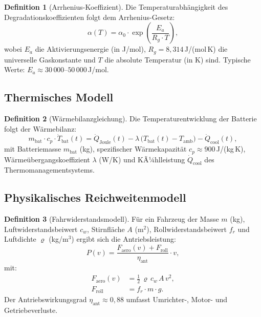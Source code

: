 ﻿\documentclass[a4paper,12pt]{article}
\theoremstyle{definition}
\newtheorem{definition}{Definition}
\begin{document}
\begin{definition}[Arrhenius-Koeffizient]
  Die Temperaturabh\"angigkeit des Degradationskoeffizienten folgt dem
  Arrhenius-Gesetz:
  \[
    \alpha(T) = \alpha_0 \cdot \exp\!\left(\frac{E_a}{R_g \cdot T}\right),
  \]
  wobei $E_a$ die Aktivierungsenergie (in J/mol), $R_g = 8{,}314$\,J/(mol\,K)
  die universelle Gaskonstante und $T$ die absolute Temperatur (in K) sind.
  Typische Werte: $E_a \approx 30\,000$--$50\,000$\,J/mol.
\end{definition}

\subsection{Thermisches Modell}

\begin{definition}[W\"armebilanzgleichung]
  Die Temperaturentwicklung der Batterie folgt der W\"armebilanz:
  \[
    m_{\mathrm{bat}} \cdot c_p \cdot \dot{T}_{\mathrm{bat}}(t)
    = \dot{Q}_{\mathrm{Joule}}(t)
      - \lambda\,\bigl(T_{\mathrm{bat}}(t) - T_{\mathrm{amb}}\bigr)
      - \dot{Q}_{\mathrm{cool}}(t),
  \]
  mit Batteriemasse $m_{\mathrm{bat}}$ (kg), spezifischer W\"armekapazit\"at
  $c_p \approx 900$\,J/(kg\,K), W\"arme\"ubergangskoeffizient $\lambda$
  (W/K) und KÃ¼hlleistung $\dot{Q}_{\mathrm{cool}}$ des Thermomanagementsystems.
\end{definition}

\subsection{Physikalisches Reichweitenmodell}

\begin{definition}[Fahrwiderstandsmodell]
  F\"ur ein Fahrzeug der Masse $m$ (kg), Luftwiderstandsbeiwert $c_w$,
  Stirnfl\"ache $A$ (m$^2$), Rollwiderstandsbeiwert $f_r$ und
  Luftdichte $\varrho$ (kg/m$^3$) ergibt sich die Antriebsleistung:
  \[
    P(v) = \frac{F_{\mathrm{aero}}(v) + F_{\mathrm{roll}}}{\eta_{\mathrm{ant}}} \cdot v,
  \]
  mit:
  \begin{align*}
    F_{\mathrm{aero}}(v) &= \tfrac{1}{2}\,\varrho\, c_w\, A\, v^2, \\
    F_{\mathrm{roll}}    &= f_r \cdot m \cdot g.
  \end{align*}
  Der Antriebswirkungsgrad $\eta_{\mathrm{ant}} \approx 0{,}88$ umfasst
  Umrichter-, Motor- und Getriebeverluste.
\end{definition}
\end{document}

